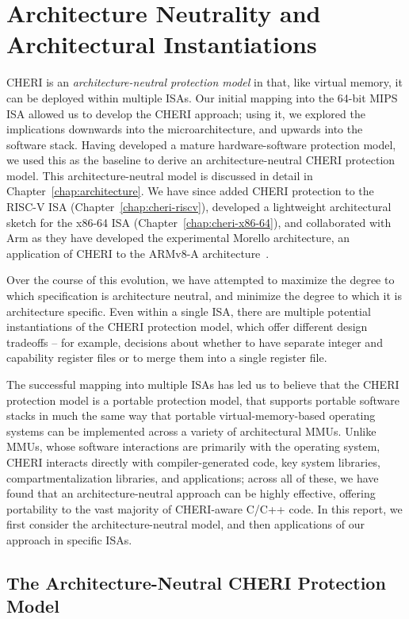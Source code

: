 \section{Architecture Neutrality and Architectural Instantiations}
\label{sec:archneut}

CHERI is an \textit{architecture-neutral protection model} in that, like
virtual memory, it can be deployed within multiple ISAs.
Our initial mapping into the 64-bit MIPS ISA allowed us to develop the
CHERI approach; using it, we explored the implications downwards into
the microarchitecture, and upwards into the software stack.
Having developed a mature hardware-software protection model, we used this as
the baseline to derive an architecture-neutral CHERI protection model.
This architecture-neutral model is discussed in detail in
Chapter~\ref{chap:architecture}.
We have since added CHERI protection to the RISC-V ISA
(Chapter~\ref{chap:cheri-riscv}), developed a
lightweight
architectural sketch for the x86-64 ISA
(Chapter~\ref{chap:cheri-x86-64}),
and collaborated with Arm as they have developed the experimental Morello
architecture, an application of CHERI to the ARMv8-A
architecture~\cite{arm-morello}.

Over the course of this evolution, we have attempted to maximize the degree to
which specification is architecture neutral, and minimize the degree to which
it is architecture specific.
Even within a single ISA, there are multiple potential instantiations of the
CHERI protection model, which offer different design tradeoffs -- for example,
decisions about whether to have separate integer and capability register files
or to merge them into a single register file.

The successful mapping into multiple ISAs has led us to believe that the CHERI
protection model is a portable protection model, that supports portable
software stacks in much the same way that portable virtual-memory-based
operating systems can be implemented across a variety of architectural MMUs.
Unlike MMUs, whose software interactions are primarily with the operating
system, CHERI interacts directly with compiler-generated code, key system
libraries, compartmentalization libraries, and applications; across all of
these, we have found that an architecture-neutral approach can be highly
effective, offering portability to the vast majority of CHERI-aware C/C++
code.
In this report, we first consider the architecture-neutral model, and then
applications of our approach in specific ISAs.

\subsection{The Architecture-Neutral CHERI Protection Model}
\label{sec:cheri-protection-model}

